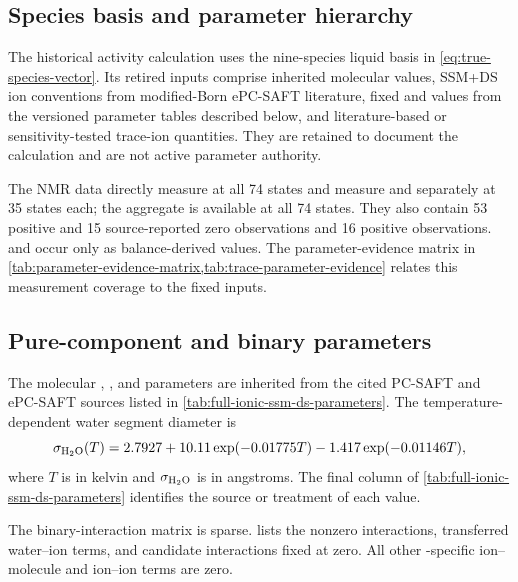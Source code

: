 \subsection{Species basis and parameter hierarchy}
The historical activity calculation uses the nine-species liquid basis in \cref{eq:true-species-vector}.  Its retired inputs comprise inherited molecular values, SSM+DS ion conventions from modified-Born ePC-SAFT literature, fixed \MEAH and \MEACOO values from the versioned parameter tables described below, and literature-based or sensitivity-tested trace-ion quantities. They are retained to document the calculation and are not active parameter authority.



The NMR data directly measure \MEACOO at all 74 states and measure \MEA and \MEAH separately at 35 states each; the  aggregate is available at all 74 states.  They also contain 53 positive and 15 source-reported zero \HCOthree observations and 16 positive \COthree observations.  \HthreeO and \Hydroxide occur only as balance-derived values.  The parameter-evidence matrix in \cref{tab:parameter-evidence-matrix,tab:trace-parameter-evidence} relates this measurement coverage to the fixed inputs.



\subsection{Pure-component and binary parameters}
The molecular \COtwo, \MEA, and \HtwoO parameters are inherited from the cited PC-SAFT and ePC-SAFT sources listed in \cref{tab:full-ionic-ssm-ds-parameters}.  The temperature-dependent water segment diameter is
\begin{equation}
    \sigma_{\HtwoO}(T)=2.7927+10.11\exp(-0.01775T)-1.417\exp(-0.01146T),
    \label{eq:water-sigma-temperature}
\end{equation}
where \(T\) is in kelvin and \(\sigma_{\HtwoO}\) is in angstroms.  The final column of \cref{tab:full-ionic-ssm-ds-parameters} identifies the source or treatment of each value.

The binary-interaction matrix is sparse.   lists the nonzero interactions, transferred water--ion terms, and candidate interactions fixed at zero.  All other \MEA-specific ion--molecule and ion--ion terms are zero.



